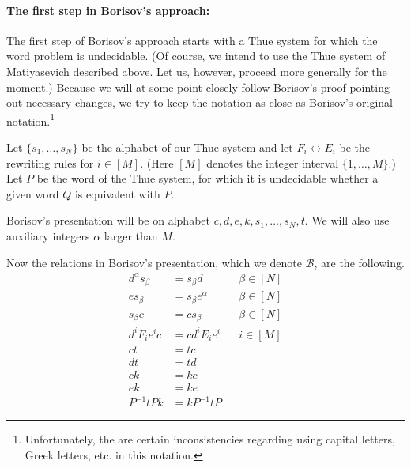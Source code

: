 \documentclass[10pt,a4paper]{article}
\theoremstyle{definition}
\theoremstyle{remark}
\newcommand\BB{\mathcal{B}}
\begin{document}
\paragraph{The first step in Borisov's approach:} 
The first step of Borisov's approach starts with a Thue system for which the word problem is undecidable. (Of
course, we intend to use the Thue system of Matiyasevich described above. Let
us, however, proceed more generally for the moment.) Because we will at some
point closely follow Borisov's proof pointing out necessary changes, we try to
keep the notation as close as Borisov's original
notation.\footnote{Unfortunately, the are certain inconsistencies
regarding using capital letters, Greek letters, etc. in this notation.}

Let $\{s_1, \dots, s_N\}$
be the alphabet of our Thue system and let $F_i \longleftrightarrow E_i$ be the
rewriting rules for $i \in [M]$. (Here $[M]$ denotes the integer interval $\{1,
\dots, M\}$.) Let $P$ be the word of the Thue system, for which it is
undecidable whether a given word $Q$ is equivalent with $P$. 

Borisov's presentation will be on alphabet $c, d, e, k, s_1, \dots, s_N, t$. 
We will also use auxiliary integers $\alpha$ larger than $M$. 

Now the relations in Borisov's presentation, which we denote $\BB$, are the following. 
\begin{align}
  d^{\alpha} s_\beta &= s_\beta d & &\beta \in [N] \tag{B1} \label{e:b1} \\
  es_{\beta} &= s_{\beta}e^{\alpha} & &\beta \in [N] \tag{B2} \label{e:b2} \\
  s_{\beta}c &= cs_{\beta} & &\beta \in [N] \tag{B3} \label{e:b3} \\
  d^iF_ie^ic &= cd^iE_ie^i & &i \in [M] \tag{B4} \label{e:b4} \\
  ct &= tc & \tag{B5} \label{e:b5} \\
  dt &= td & \tag{B6} \label{e:b6} \\
  ck &= kc & \tag{B7} \label{e:b7} \\
  ek &= ke & \tag{B8} \label{e:b8} \\
  P^{-1}tPk &= kP^{-1}tP &
  \label{e:b9}
  \tag{B9}
\end{align}
\end{document}
